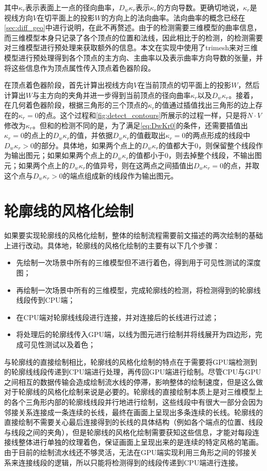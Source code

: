 其中$\kappa_r$表示表面上一点的径向曲率，$D_w\kappa_r$表示$\kappa_r$的方向导数。更确切地说，$\kappa_r$是视线方向$V$在切平面上的投影$W$的方向上的法向曲率。法向曲率的概念已经在\autoref{sec:diff_geo}中进行说明，在此不再赘述。由于\scon{}的检测需要三维模型的曲率信息，而三维模型本身只记录了各个顶点的位置和法线，因此相比于\con{}的检测，\scon{}的检测需要对三维模型进行预处理来获取额外的信息。本文在实现中使用了trimesh\cite{trimesh}来对三维模型进行预处理得到各个顶点的主方向、主曲率以及表示曲率方向导数的张量，并将这些信息作为顶点属性传入顶点着色器阶段。

在顶点着色器阶段，首先计算出视线方向$V$在当前顶点的切平面上的投影$W$，然后计算出$W$与主方向的夹角并进一步得到当前顶点的径向曲率$\kappa_r$以及$D_w\kappa_r$。接着，在几何着色器阶段，根据三角形的三个顶点的$\kappa_r$的值通过插值找出三角形的边上存在的$\kappa_r = 0$的点。这个过程和\autoref{fig:detect_contours}所展示的过程一样，只是将$N\cdot{V}$修改为$\kappa_r$。但和\con{}的检测不同的是，为了满足\autoref{eq:DwKr0}的条件，还需要插值出$\kappa_r = 0$的点上的$D_w\kappa_r$的值，并依据$D_w\kappa_r$的值截取出$\kappa_r = 0$的两点形成的线段中$D_w\kappa_r > 0$的部分。具体地，如果两个点上的$D_w\kappa_r$的值都大于0，则保留整个线段作为输出图元；如果如果两个点上的$D_w\kappa_r$的值都小于0，则去掉整个线段，不输出图元；如果两个点上的$D_w\kappa_r$的值异号，则在这两点之间插值出$D_w\kappa_r = 0$的点，并取这个点与$D_w\kappa_r > 0$的端点组成新的线段作为输出图元。

\section{轮廓线的风格化绘制}

如果要实现轮廓线的风格化绘制，整体的绘制流程需要前文描述的两次绘制的基础上进行改动。具体地，轮廓线的风格化绘制的主要有以下几个步骤：

\begin{itemize}
    \item 先绘制一次场景中所有的三维模型但不进行着色，得到用于可见性测试的深度图；
    \item 再绘制一次场景中所有的三维模型，完成轮廓线的检测，将检测得到的轮廓线线段传到CPU端；
    \item 在CPU端对轮廓线线段进行连接，并对连接后的长线进行过滤；
    \item 将处理后的轮廓线传入GPU端，以线为图元进行绘制并将线展开为四边形，完成可见性测试以及着色；
\end{itemize}

与轮廓线的直接绘制相比，轮廓线的风格化绘制的特点在于需要将GPU端检测到的轮廓线线段传递到CPU端进行处理，再传回GPU端进行绘制。尽管CPU与GPU之间相互的数据传输会造成绘制流水线的停滞，影响整体的绘制速度，但是这么做对于轮廓线的风格化绘制来说是必要的。轮廓线的直接绘制本质上是对三维模型上的各个三角形内部的轮廓线线段并行地进行绘制，这些线段中有很大一部分会因为邻接关系连接成一条连续的长线，最终在画面上呈现出多条连续的长线。轮廓线的直接绘制不需要关心最后连接得到的长线的具体结构（例如各个端点的位置、线段与线段之间的夹角），但是轮廓线的风格化绘制需要获知这些信息，才能对每段连接线整体进行单独的纹理着色，保证画面上呈现出来的是连续的特定风格的笔画。由于目前的绘制流水线还不够灵活，无法在GPU端实现利用三角形之间的邻接关系来连接线段的逻辑，所以只能将检测得到的线段传递到CPU端进行连接。


